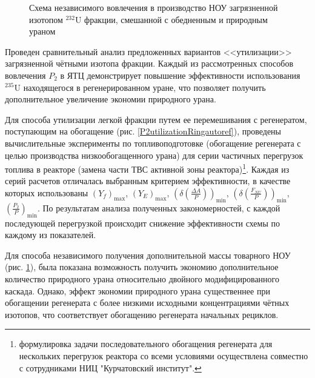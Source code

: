 \begin{figure}[ht]
  \caption{Схема независимого вовлечения в производство НОУ загрязненной изотопом $^{232}$U фракции, смешанной с обедненным и природным ураном}\label{P2utilizationautoref}
\end{figure}

Проведен сравнительный анализ предложенных вариантов <<утилизации>> загрязненной чётными изотопа фракции. Каждый из рассмотренных способов вовлечения $P_2$ в ЯТЦ демонстрирует повышение эффективности использования $^{235}$U находящегося в регенерированном уране, что позволяет получить дополнительное увеличение экономии природного урана.

Для способа утилизации легкой фракции путем ее перемешивания с регенератом, поступающим на обогащение (рис. \ref{P2utilizationRingautoref}), проведены вычислительные эксперименты по топливоподготовке (обогащение регенерата с целью производства низкообогащенного урана) для серии частичных перегрузок топлива в реакторе (замена части ТВС активной зоны реактора)\footnote{формулировка задачи последовательного обогащения регенерата для нескольких перегрузок реактора со всеми условиями осуществлена совместно с сотрудниками НИЦ "Курчатовский институт".}. Каждая из серий расчетов отличалась выбранным критерием эффективности, в качестве которых использованы $(Y_f)_\text{max}$, $(Y_{E})_\text{max}$, $(\delta(\frac{\Delta A}{P}))_\text{min}$, $(\delta(\frac{F_{NU}}{P}))_\text{min}$, $(\frac{P_2}{P})_\text{min}$. По результатам анализа полученных закономерностей, с каждой последующей перегрузкой происходит снижение эффективности схемы по каждому из показателей.

Для способа независимого получения дополнительной массы товарного НОУ (рис. \ref{P2utilizationautoref}), была показана возможность получить экономию дополнительное количество природного урана относительно двойного модифицированного каскада. Однако, эффект экономии природного урана существеннее при обогащении регенерата с более низкими исходными концентрациями чётных изотопов, что соответствует обогащению регенерата начальных рециклов.

